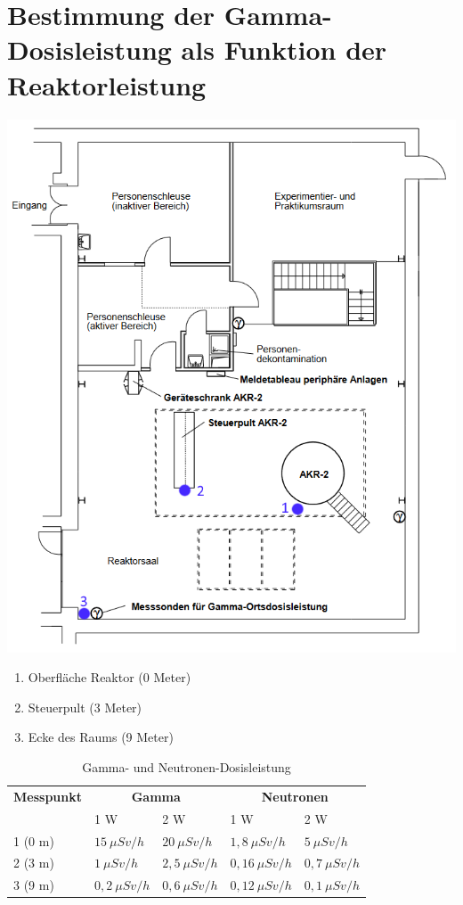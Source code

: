 \documentclass[12pt,german]{article}
\begin{document}
	\section{Bestimmung der Gamma-Dosisleistung als Funktion der Reaktorleistung}
	\includegraphics{AKR_Raumplan_Messpunkte.png}
	\begin{enumerate}
		\item Oberfläche Reaktor (0 Meter)
		\item Steuerpult (3 Meter)
		\item Ecke des Raums (9 Meter)
	\end{enumerate}

	\begin{table}[htpb]
		\begin{tabularx}{\textwidth}{X|X|X|X|X}
			\toprule
			\textbf{Messpunkt} & \multicolumn{2}{c}{\textbf{Gamma}} & \multicolumn{2}{c}{\textbf{Neutronen}} \\
			\cmidrule{2-3}\cmidrule{4-5}
			& 1 W & 2 W & 1 W & 2 W \\
			\midrule
			1 (0 m) & $15\: \mu Sv / h$ & $20\: \mu Sv / h$ & $1,8\: \mu Sv / h$ & $5\: \mu Sv / h$ \\
			2 (3 m) & $1\: \mu Sv / h$ & $2,5\: \mu Sv / h$ & $0,16\: \mu Sv / h$ & $0,7\: \mu Sv / h$ \\
			3 (9 m) & $0,2\: \mu Sv / h$ & $0,6\: \mu Sv / h$ & $0,12\: \mu Sv / h$ & $0,1\: \mu Sv / h$ \\
			\bottomrule
		\end{tabularx}
		\caption{Gamma- und Neutronen-Dosisleistung}
	\end{table}
\end{document}

